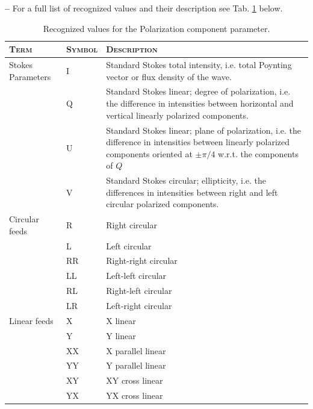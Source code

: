 \documentclass[a4paper,10pt,bibtotoc]{scrreprt}
\begin{document}
\begin{list}{\textbf{--}}{}
 For a full list of recognized values and their description see
  Tab. \ref{tab:polarization-values} below.
  \begin{table}[ht]
    \centering
    \begin{tabular}{|llp{10cm}|}
      \hline
      \textsc{Term} & \textsc{Symbol} & \textsc{Description} \\
      \hline \hline
      Stokes Parameters & I & Standard Stokes total intensity,
      i.e. total Poynting vector or flux density of the wave. \\
      & Q  & Standard Stokes linear; degree of polarization, i.e. the
      difference in intensities between horizontal and vertical
      linearly polarized components. \\
      & U  & Standard Stokes linear; plane of polarization, i.e. the
      difference in intensities between linearly polarized components
      oriented at $\pm \pi/4$ w.r.t. the components of $Q$ \\
      & V  & Standard Stokes circular; ellipticity, i.e. the differences
      in intensities between right and left circular polarized
      components. \\
      \hline
      Circular feeds & R  & Right circular \\
      & L  & Left circular \\
      & RR & Right-right circular \\
      & LL & Left-left circular \\
      & RL & Right-left circular \\
      & LR & Left-right circular \\
      \hline
      Linear feeds & X  & X linear \\
      & Y  & Y linear \\
      & XX & X parallel linear \\
      & YY & Y parallel linear \\
      & XY & XY cross linear \\
      & YX & YX cross linear \\
      \hline
    \end{tabular}
    \caption{Recognized values for the Polarization component parameter.}
    \label{tab:polarization-values}
  \end{table}
\end{list}

\end{document}
